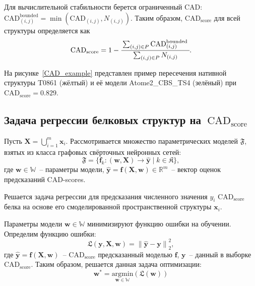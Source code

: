 \documentclass[14pt]{extarticle}
\begin{document}
Для вычислительной стабильности берется ограниченный CAD: $\mathrm{CAD}_{(i, j)}^{\text {bounded}}=\min \left(\mathrm{CAD}_{(i, j)}, N_{(i, j)}\right)$. Таким образом, $\text{CAD}_\text{score}$ для всей структуры определяется как
\begin{align}
\mathrm{CAD}_\text{score}=1-\cfrac{\sum_{(i, j) \in P} \mathrm{CAD}_{(i, j)}^{\text {bounded }}}{\sum_{(i, j) \in P} N_{(i, j)}}.
\label{CAD_score}
\end{align}

На рисунке~\ref{CAD_example} представлен пример пересечения нативной структуры T0861 (жёлтый) и её модели Atome2\_CBS\_TS4 (зелёный) при $\mathrm{CAD}_\text{score}=0.829$.

\subsection{Задача регрессии белковых структур на~$\text{CAD}_\text{score}$}

Пусть $\mathbf{X} = \bigcup_{i=1}^m \mathbf{x}_i$. Рассмотривается множество параметрических моделей $\mathfrak{F}$, взятых из класса графовых свёрточных нейронных сетей: 
\[\mathfrak{F} = \{\mathbf{f}_k\colon(\mathbf{w}, \mathbf{X})\to  \mathbf{\hat{y}}\mid k \in \mathfrak{K}\},\] 
где $\mathbf{w} \in \mathbb{W}$~-- параметры модели, $\hat{\mathbf{y}} = \mathbf{f} (\mathbf{X},\mathbf{w}) \in \mathbb{R}^{m}$~-- вектор оценок предсказаний CAD-scores. 

Решается задача регрессии для предсказания численного значения $y_i$ $\text{CAD}_\text{score}$ белка на основе его смоделированной пространственной структуры $\mathbf{x}_i$.

Параметры модели $\mathbf{w}\in \mathbb{W}$ минимизируют функцию ошибки на обучении. Определим функцию ошибки:
\[\mathfrak{L}(\mathbf{y}, \mathbf{X}, \mathbf{w}) =\left\lVert \hat{\mathbf{y}} - \mathbf{y} \right\rVert^{2}_2,\]
где $\mathbf{\hat{y}} = \mathbf{f} (\mathbf{X},\mathbf{w})$~-- $\text{CAD}_\text{score}$ предсказанный моделью $\mathbf{f}$, $\mathbf{y}$~-- данный в выборке $\text{CAD}_\text{score}$.
Таким образом, решается данная задача оптимизации: 
$$\textbf{w}^* = \underset{\mathbf{w}\in\mathbb{W}}{\text{argmin}}(\mathfrak{L}(\textbf{w}))$$
\end{document}
